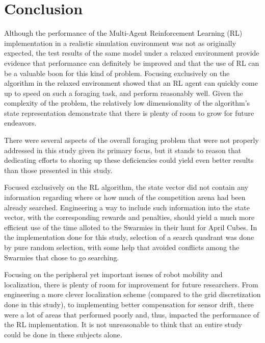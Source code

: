 \documentclass[sigconf,authordraft]{acmart}
\begin{document}
\section{Conclusion}\label{sec:conclusion}
Although the performance of the Multi-Agent Reinforcement Learning (RL) implementation in a realistic simulation environment was not as originally expected, the test results of the same model under a relaxed environment provide evidence that performance can definitely be improved and that the use of RL can be a valuable boon for this kind of problem. Focusing exclusively on the algorithm in the relaxed environment showed that an RL agent can quickly come up to speed on such a foraging task, and perform reasonably well. Given the complexity of the problem, the relatively low dimensionality of the algorithm's state representation demonstrate that there is plenty of room to grow for future endeavors.

There were several aspects of the overall foraging problem that were not properly addressed in this study given its primary focus, but it stands to reason that dedicating efforts to shoring up these deficiencies could yield even better results than those presented in this study.

Focused exclusively on the RL algorithm, the state vector did not contain any information regarding where or how much of the competition arena had been already searched. Engineering a way to include such information into the state vector, with the corresponding rewards and penalties, should yield a much more efficient use of the time alloted to the Swarmies in their hunt for April Cubes. In the implementation done for this study, selection of a search quadrant was done by pure random selection, with some help that avoided conflicts among the Swarmies that chose to go searching.

Focusing on the peripheral yet important issues of robot mobility and localization, there is plenty of room for improvement for future researchers. From engineering a more clever localization scheme (compared to the grid discretization done in this study), to implementing better compensation for sensor drift, there were a lot of areas that performed poorly and, thus, impacted the performance of the RL implementation. It is not unreasonable to think that an entire study could be done in these subjects alone.
\end{document}
